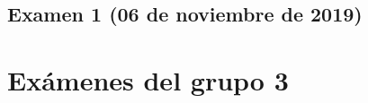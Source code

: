 \documentclass[a4paper,12pt,twoside]{book}
\begin{document}
\section{Examen 1 (06 de noviembre de 2019)}
    
\chapter{Exámenes del grupo 3}
\end{document}
